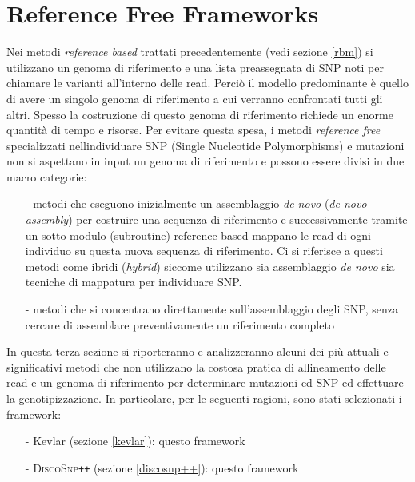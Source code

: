 \documentclass[../main.tex]{subfiles}
\begin{document}
\section{Reference Free Frameworks}
\label{rfm}

Nei metodi \textit{reference based} trattati precedentemente (vedi sezione \ref{rbm}) si utilizzano un genoma di riferimento e una lista preassegnata di SNP noti per chiamare le varianti all'interno delle read. Perciò il modello predominante è quello di avere un singolo genoma di riferimento a cui verranno confrontati tutti gli altri. Spesso la costruzione di questo genoma di riferimento richiede un enorme quantità di tempo e risorse. Per evitare questa spesa, i metodi \textit{reference free} specializzati nell\textquotesingle individuare SNP (Single Nucleotide Polymorphisms) e mutazioni non si aspettano in input un genoma di riferimento e possono essere divisi in due macro categorie:

\begin{itemize} 
\item[-] metodi che eseguono inizialmente un assemblaggio \textit{de novo} (\textit{de novo assembly}) per costruire una sequenza di riferimento e successivamente tramite un sotto-modulo (subroutine) reference based mappano le read di ogni individuo su questa nuova sequenza di riferimento. Ci si riferisce a questi metodi come ibridi (\textit{hybrid}) siccome utilizzano sia assemblaggio \textit{de novo} sia tecniche di mappatura per individuare SNP.
\item[-] metodi che si concentrano direttamente sull’assemblaggio degli SNP, senza cercare di assemblare preventivamente un riferimento completo
\end{itemize}

In questa terza sezione si riporteranno e analizzeranno alcuni dei più attuali e significativi metodi che non utilizzano la costosa pratica di allineamento delle read e un genoma di riferimento per determinare mutazioni ed SNP ed effettuare la genotipizzazione. In particolare, per le seguenti ragioni, sono stati selezionati i framework:
\begin{itemize} 
\item[-] Kevlar (sezione \ref{kevlar}): questo framework \cite{}
\item[-] \textsc{DiscoSnp}\texttt{++} (sezione \ref{discosnp++}): questo framework \cite{} 
\end{itemize}
\end{document}
